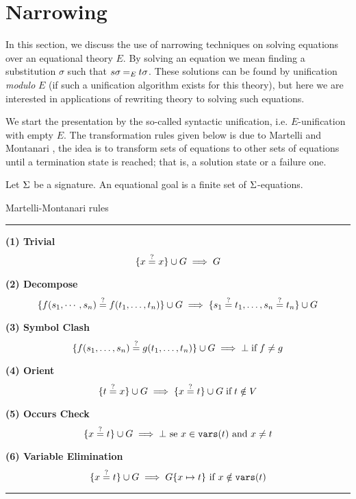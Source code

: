 \section{Narrowing}

In this section, we discuss the use of narrowing techniques on solving equations over an equational theory $E$. By solving an equation we mean finding a substitution $\sigma$ such that $s \sigma \mathbin{=_{E}} t\sigma$. These solutions can be found by unification \textit{modulo} $E$ (if such a unification algorithm exists for this theory), but here we are interested in applications of rewriting theory to solving such equations.

We start the presentation by the so-called syntactic unification, i.e. $E$-unification with empty $E$. The transformation rules given below is due to Martelli and Montanari \cite{DBLP:books/el/RV01/BaaderS01}, the idea is to transform sets of equations to other sets of equations until a termination state is reached; that is, a solution state or a failure one.

\begin{definition}
	Let $\Sigma$ be a signature. An equational goal is a finite set of $\Sigma$-equations.
\end{definition}

\begin{table}[ht]
	\caption{Martelli-Montanari rules}
	\label{table:unify_inf_rules}
	{\small
		\hrule
		\vspace{10pt}

		\textbf{(1) Trivial}
        $$\{ x\overset{?}{=}x \} \cup G \implies G $$

		\textbf{(2) Decompose}
		$$\{f(s_1, \cdots, s_n)\overset{?}{=}f(t_1, \dots, t_n)\} \cup G \implies \{s_1\overset{?}{=}t_1, \dots , s_n\overset{?}{=}t_n \} \cup G$$

		\textbf{(3) Symbol Clash}
		$$\{ f(s_1, \dots, s_n)\overset{?}{=}g(t_1, \dots, t_n) \} \cup G \implies \bot \; \text{if} \; f \neq g $$

		\textbf{(4) Orient}
		$$\{ t\overset{?}{=}x \} \cup G \implies \{ x\overset{?}{=}t \} \cup G \; \text{if} \; t \notin V$$

		\textbf{(5) Occurs Check}
		$$\{ x\overset{?}{=}t \} \cup G \implies \bot \text{ se } x \in \mathtt{vars}(t) \text{ and } x \neq t$$

		\textbf{(6) Variable Elimination}
		$$\{ x\overset{?}{=}t \} \cup G \implies G\{x \mapsto t\} \text{ if } x \notin \mathtt{vars}(t)$$
		\hrule
	}
\end{table}

